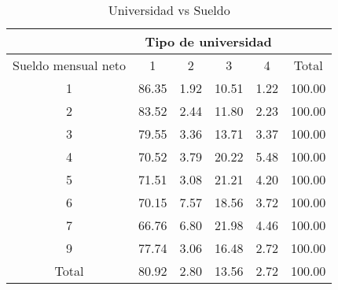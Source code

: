 \documentclass{article}
\begin{document}
\begin{table}[]
\centering
\caption{Universidad vs Sueldo}
\begin{tabular}{c|cccc|c}  \hline  \hline
                                & \multicolumn{4}{c|}{Tipo de universidad}                       &                       \\  \hline
Sueldo mensual neto  & 1       & 2       & 3       & 4                   & Total                \\  \hline
1                               & 86.35   & 1.92    & 10.51   & 1.22                & 100.00               \\
2                               & 83.52   & 2.44    & 11.80   & 2.23                & 100.00               \\
3                               & 79.55   & 3.36    & 13.71   & 3.37                & 100.00               \\
4                               & 70.52   & 3.79    & 20.22   & 5.48                & 100.00               \\
5                               & 71.51   & 3.08    & 21.21   & 4.20                & 100.00               \\
6                               & 70.15   & 7.57    & 18.56   & 3.72                & 100.00               \\
7                               & 66.76   & 6.80    & 21.98   & 4.46                & 100.00               \\
9                               & 77.74   & 3.06    & 16.48   & 2.72                & 100.00               \\
Total      & 80.92   & 2.80    & 13.56   & 2.72                & 100.00              \\  \hline  \hline
\end{tabular}
\end{table}
\end{document}
